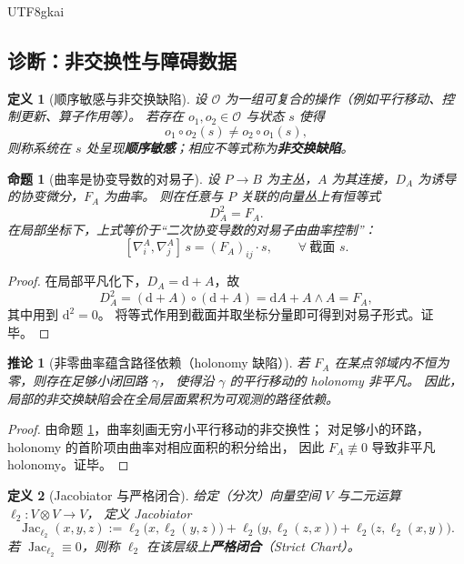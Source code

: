 \documentclass[12pt]{article}
\newtheorem{definition}{定义}[section]
\newtheorem{proposition}{命题}[section]
\newtheorem{corollary}{推论}[section]
\begin{document}
\begin{CJK*}{UTF8}{gkai}
\subsection{诊断：非交换性与障碍数据}

\begin{definition}[顺序敏感与非交换缺陷]\label{def:C-order-sensitivity}
设 $\mathcal{O}$ 为一组可复合的操作（例如平行移动、控制更新、算子作用等）。
若存在 $o_1,o_2\in\mathcal{O}$ 与状态 $s$ 使得
\[
  o_1\circ o_2(s)\neq o_2\circ o_1(s),
\]
则称系统在 $s$ 处呈现\textbf{顺序敏感}；相应不等式称为\textbf{非交换缺陷}。
\end{definition}

\begin{proposition}[曲率是协变导数的对易子]\label{prop:C-curvature-commutator}
设 $P\to B$ 为主丛，$A$ 为其连接，$D_A$ 为诱导的协变微分，$F_A$ 为曲率。
则在任意与 $P$ 关联的向量丛上有恒等式
\[
  D_A^2 = F_A.
\]
在局部坐标下，上式等价于“二次协变导数的对易子由曲率控制”：
\[
  [\nabla^A_i,\nabla^A_j]\,s = (F_A)_{ij}\cdot s,
  \qquad \forall\ \text{截面 } s.
\]
\end{proposition}

\begin{proof}
在局部平凡化下，$D_A=\mathrm{d}+A$，故
\[
  D_A^2=(\mathrm{d}+A)\circ(\mathrm{d}+A)=\mathrm{d}A + A\wedge A = F_A,
\]
其中用到 $\mathrm{d}^2=0$。
将等式作用到截面并取坐标分量即可得到对易子形式。证毕。
\end{proof}

\begin{corollary}[非零曲率蕴含路径依赖（holonomy 缺陷）]\label{cor:C-holonomy-defect}
若 $F_A$ 在某点邻域内不恒为零，则存在足够小闭回路 $\gamma$，
使得沿 $\gamma$ 的平行移动的 holonomy 非平凡。
因此，局部的非交换缺陷会在全局层面累积为可观测的路径依赖。
\end{corollary}

\begin{proof}
由命题 \ref{prop:C-curvature-commutator}，曲率刻画无穷小平行移动的非交换性；
对足够小的环路，holonomy 的首阶项由曲率对相应面积的积分给出，
因此 $F_A\not\equiv 0$ 导致非平凡 holonomy。证毕。
\end{proof}

\begin{definition}[Jacobiator 与严格闭合]\label{def:C-jacobiator}
给定（分次）向量空间 $V$ 与二元运算 $\ell_2:V\otimes V\to V$，
定义 Jacobiator
\[
  \operatorname{Jac}_{\ell_2}(x,y,z)
  :=
  \ell_2\bigl(x,\ell_2(y,z)\bigr)
  +\ell_2\bigl(y,\ell_2(z,x)\bigr)
  +\ell_2\bigl(z,\ell_2(x,y)\bigr).
\]
若 $\operatorname{Jac}_{\ell_2}\equiv 0$，则称 $\ell_2$ 在该层级上\textbf{严格闭合}（Strict Chart）。
\end{definition}


\end{CJK*}
\end{document}
